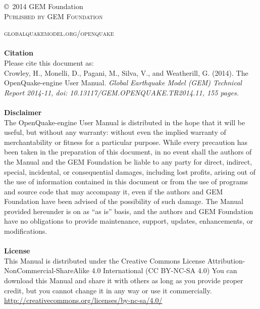 \documentclass[11pt,fleqn]{book} %
\begin{document}
\noindent \copyright\ 2014 GEM Foundation\\ %

\noindent \textsc{Published by GEM Foundation} %

\noindent \textsc{globalquakemodel.org/openquake}\\ %

\noindent \hfill \\
   {\textbf{Citation}} \hfill \\
   Please cite this document as: \hfill \\
   Crowley, H., Monelli, D., Pagani, M., Silva, V., 
   and Weatherill, G. (2014). 
   The OpenQuake-engine User Manual. 
   \textit{Global Earthquake Model (GEM) Technical Report 2014-11, 
   doi: 10.13117/\-GEM.OPENQUAKE.\-TR2014.11, 155 pages.} \\
   \hfill \\

\noindent
   {\bf{Disclaimer}} \hfill \\
   The OpenQuake-engine User Manual is distributed in the hope that it will be 
   useful, but without any warranty: without even the implied warranty of 
   merchantability or fitness for a particular purpose. While every precaution 
   has been taken in the preparation of this document, in no event shall the 
   authors of the Manual and the GEM Foundation be liable to any party for 
   direct, indirect, special, incidental, or consequential damages, including 
   lost profits, arising out of the use of information contained in this 
   document or from the use of programs and source code that may accompany it, 
   even if the authors and GEM Foundation have been advised of the possibility 
   of such damage. The Manual provided hereunder is on as ``as is'' basis, and the 
   authors and GEM Foundation have no obligations to provide maintenance, 
   support, updates, enhancements, or modifications. \hfill \\
   \hfill \\
\noindent
   {\bf{License}} \hfill \\
   This Manual is distributed under the Creative Commons License 
   Attribution-NonCommercial-ShareAlike 4.0 International (CC BY-NC-SA 4.0)
   You can download this Manual and share it with 
   others as long as you provide proper credit, but you cannot change 
   it in any way or use it commercially.\hfill \\
   \href{http://creativecommons.org/licenses/by-nc-sa/4.0/}
   {http://creativecommons.org/licenses/by-nc-sa/4.0/}\hfill \\
\end{document}
